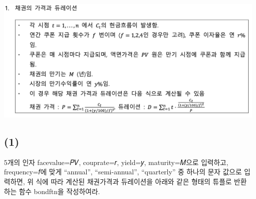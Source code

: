 \documentclass[
  letterpaper,
  DIV=11,
  numbers=noendperiod]{scrreprt}
\begin{document}

\includegraphics{images/Python_midterm1.png}

\subsection*{(1)}\label{section-10}

5개의 인자 facevalue=𝑃𝑉, couprate=𝑟, yield=𝑦, maturity=𝑀으로 입력하고,
frequency=𝑓에 맞게 ``annual'', ``semi-annual'', ``quarterly'' 중 하나의
문자 값으로 입력하면, 위 식에 따라 계산된 채권가격과 듀레이션을 아래와
같은 형태의 튜플로 반환하는 함수 bondftn을 작성하여라.
\end{document}

